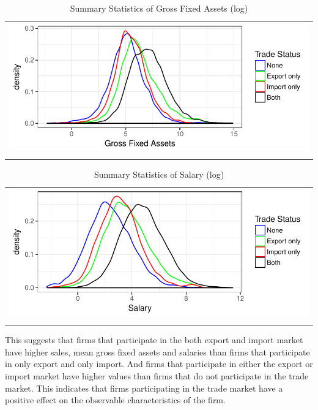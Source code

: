 \documentclass[12pt]{article}
\begin{document}
\begin{center}
\begin{table}[H]
\caption{Summary Statistics of Gross Fixed Assets (log)}
\label{lgfa}
\begin{tabular}{c}
 \includegraphics{./PICS/denslgfa.pdf}   \\ 
   \\  
\end{tabular}
\end{table}
\end{center}



\begin{center}
\begin{table}[H]
\caption{Summary Statistics of Salary (log)}
\label{tab:lsalary}
\begin{tabular}{c}
 \includegraphics{./PICS/denslsalary.pdf}   \\ 
   \\  
\end{tabular}
\end{table}
\end{center}
 \restoregeometry


This suggests that firms that participate in the both export and import market have
higher sales, mean gross fixed assets and 
salaries  than firms that participate in
only export and only import.  And firms that participate in either the
export or import market have higher values  than firms that do not
participate in the trade market. This indicates that firms participating
in the trade market have a positive effect on the observable
characteristics of the firm.
\end{document}
